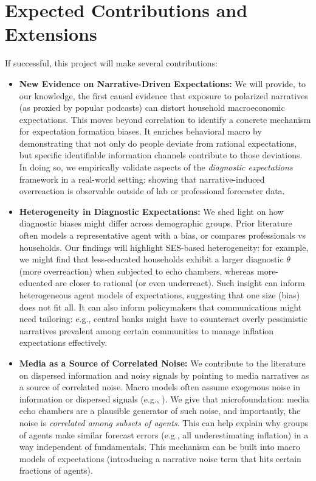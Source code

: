 \documentclass[12pt]{article}
\begin{document}
\section{Expected Contributions and Extensions}
If successful, this project will make several contributions:
\begin{itemize}
    \item \textbf{New Evidence on Narrative-Driven Expectations:} We will provide, to our knowledge, the first causal evidence that exposure to polarized narratives (as proxied by popular podcasts) can distort household macroeconomic expectations. This moves beyond correlation to identify a concrete mechanism for expectation formation biases. It enriches behavioral macro by demonstrating that not only do people deviate from rational expectations, but specific identifiable information channels contribute to those deviations. In doing so, we empirically validate aspects of the \textit{diagnostic expectations} framework in a real-world setting: showing that narrative-induced overreaction is observable outside of lab or professional forecaster data.
    \item \textbf{Heterogeneity in Diagnostic Expectations:} We shed light on how diagnostic biases might differ across demographic groups. Prior literature often models a representative agent with a bias, or compares professionals vs households. Our findings will highlight SES-based heterogeneity: for example, we might find that less-educated households exhibit a larger diagnostic $\theta$ (more overreaction) when subjected to echo chambers, whereas more-educated are closer to rational (or even underreact). Such insight can inform heterogeneous agent models of expectations, suggesting that one size (bias) does not fit all. It can also inform policymakers that communications might need tailoring: e.g., central banks might have to counteract overly pessimistic narratives prevalent among certain communities to manage inflation expectations effectively.

    \item \textbf{Media as a Source of Correlated Noise:} We contribute to the literature on dispersed information and noisy signals by pointing to media narratives as a source of correlated noise. Macro models often assume exogenous noise in information or dispersed signals (e.g., \citep{Lorenzoni2009}). We give that microfoundation: media echo chambers are a plausible generator of such noise, and importantly, the noise is \emph{correlated among subsets of agents}. This can help explain why groups of agents make similar forecast errors (e.g., all underestimating inflation) in a way independent of fundamentals. This mechanism can be built into macro models of expectations (introducing a narrative noise term that hits certain fractions of agents).


\end{itemize}
\end{document}

